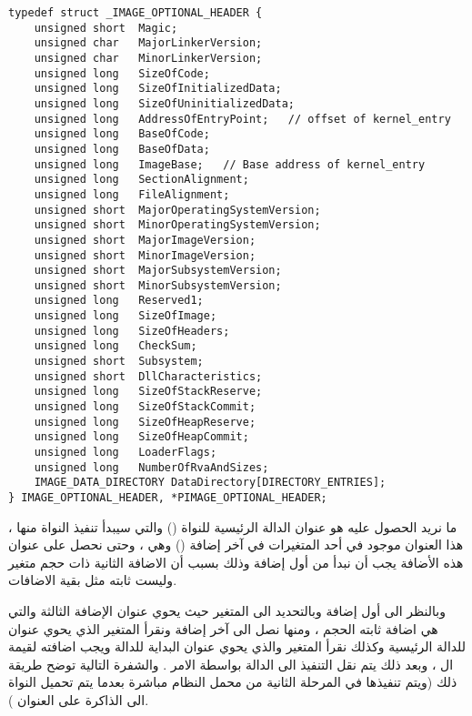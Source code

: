 \documentclass[document.tex]{subfiles}
\begin{document}
\begin{english}
\begin{lstlisting}[label=newdelete,caption=Global new/delete operator]
typedef struct _IMAGE_OPTIONAL_HEADER {
    unsigned short  Magic;
    unsigned char   MajorLinkerVersion;
    unsigned char   MinorLinkerVersion;
    unsigned long   SizeOfCode;
    unsigned long   SizeOfInitializedData;
    unsigned long   SizeOfUninitializedData;
    unsigned long   AddressOfEntryPoint;   // offset of kernel_entry
    unsigned long   BaseOfCode;
    unsigned long   BaseOfData;
    unsigned long   ImageBase;   // Base address of kernel_entry
    unsigned long   SectionAlignment;
    unsigned long   FileAlignment;
    unsigned short  MajorOperatingSystemVersion;
    unsigned short  MinorOperatingSystemVersion;
    unsigned short  MajorImageVersion;
    unsigned short  MinorImageVersion;
    unsigned short  MajorSubsystemVersion;
    unsigned short  MinorSubsystemVersion;
    unsigned long   Reserved1;
    unsigned long   SizeOfImage;
    unsigned long   SizeOfHeaders;
    unsigned long   CheckSum;
    unsigned short  Subsystem;
    unsigned short  DllCharacteristics;
    unsigned long   SizeOfStackReserve;
    unsigned long   SizeOfStackCommit;
    unsigned long   SizeOfHeapReserve;
    unsigned long   SizeOfHeapCommit;
    unsigned long   LoaderFlags;
    unsigned long   NumberOfRvaAndSizes;
    IMAGE_DATA_DIRECTORY DataDirectory[DIRECTORY_ENTRIES];
} IMAGE_OPTIONAL_HEADER, *PIMAGE_OPTIONAL_HEADER;

\end{lstlisting}
\end{english}

ما نريد الحصول عليه هو عنوان الدالة الرئيسية للنواة () والتي سيبدأ تنفيذ النواة منها ، هذا العنوان موجود في أحد المتغيرات في آخر إضافة () وهي  ، وحتى نحصل على عنوان هذه الأضافة يجب أن نبدأ من أول إضافة وذلك بسبب أن الاضافة الثانية ذات حجم متغير وليست ثابته مثل بقية الاضافات.


وبالنظر الى أول إضافة   وبالتحديد الى المتغير  حيث يحوي عنوان الإضافة الثالثة  والتي هي اضافة ثابته الحجم ، ومنها نصل الى آخر إضافة ونقرأ المتغير  الذي يحوي عنوان  للدالة الرئيسية وكذلك نقرأ المتغير  والذي يحوي عنوان البداية للدالة ويجب اضافته لقيمة ال  ، وبعد ذلك يتم نقل التنفيذ الى الدالة بواسطة الامر . والشفرة التالية توضح طريقة ذلك (ويتم تنفيذها في المرحلة الثانية من محمل النظام مباشرة بعدما يتم تحميل النواة الى الذاكرة على العنوان ).

\end{document}
